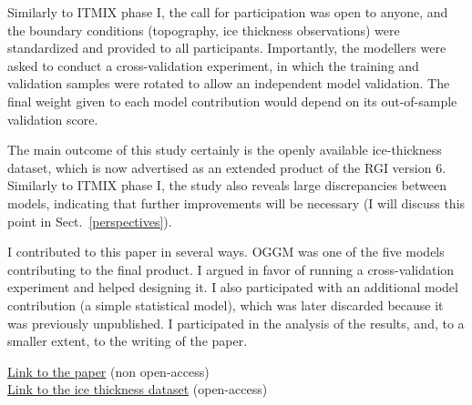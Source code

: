 Similarly to ITMIX phase I, the call for participation was open to anyone, and the boundary conditions (topography, ice
thickness observations) were standardized and provided to all participants. Importantly, the modellers were asked to
conduct a cross-validation experiment, in which the training and validation samples were rotated to allow an independent
model validation. The final weight given to each model contribution would depend on its out-of-sample validation score.

The main outcome of this study certainly is the openly available ice-thickness dataset, which is now advertised as an
extended product of the RGI version 6. Similarly to ITMIX phase I, the study also reveals large discrepancies between
models, indicating that further improvements will be necessary (I will discuss this point
in Sect.~\ref{perspectives}).

I contributed to this paper in several ways. OGGM was one of the five models contributing to the final product. 
I argued in favor of running a cross-validation experiment and helped designing it. I also participated with an 
additional model contribution (a simple statistical model), which was later discarded because it was previously unpublished.
I participated in the analysis of the results, and, to a smaller extent, to the writing of the paper.

\href{https://doi.org/10.1038/s41561-019-0300-3}{Link to the paper} (non open-access) \\
\href{https://doi.org/10.3929/ethz-b-000315707}{Link to the ice thickness dataset} (open-access)


%

